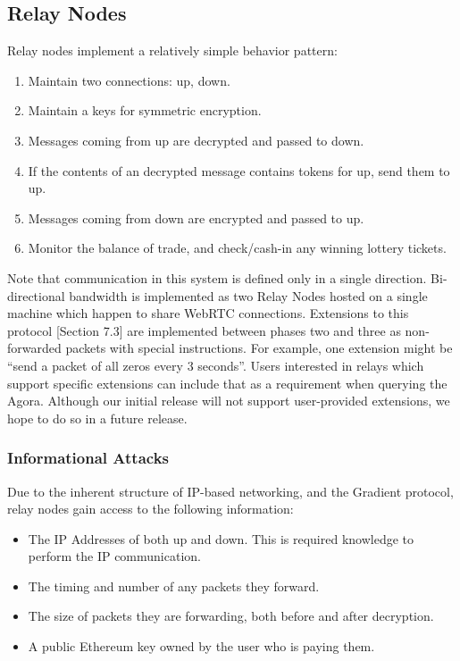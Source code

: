 \documentclass{article}
\begin{document}
\subsection{Relay Nodes}

Relay nodes implement a relatively simple behavior pattern:

\begin{enumerate}
    \item Maintain two connections: up, down.
    \item Maintain a keys for symmetric encryption.
    \item Messages coming from up are decrypted and passed to down.
    \item If the contents of an decrypted message contains tokens for up, send them to up.
    \item Messages coming from down are encrypted and passed to up.
    \item Monitor the balance of trade, and check/cash-in any winning lottery tickets.
\end{enumerate}

Note that communication in this system is defined only in a single direction. Bi-directional bandwidth is implemented as two Relay Nodes hosted on a single machine which happen to share WebRTC connections. Extensions to this protocol [Section 7.3] are implemented between phases two and three as non-forwarded packets with special instructions. For example, one extension might be “send a packet of all zeros every 3 seconds”. Users interested in relays which support specific extensions can include that as a requirement when querying the Agora. Although our initial release will not support user-provided extensions, we hope to do so in a future release.

\subsubsection{Informational Attacks}

Due to the inherent structure of IP-based networking, and the Gradient protocol, relay nodes gain access to the following information:

\begin{itemize}
    \item The IP Addresses of both up and down. This is required knowledge to perform the IP communication.
    \item The timing and number of any packets they forward.
    \item The size of packets they are forwarding, both before and after decryption.
    \item A public Ethereum key owned by the user who is paying them.
\end{itemize}
\end{document}
